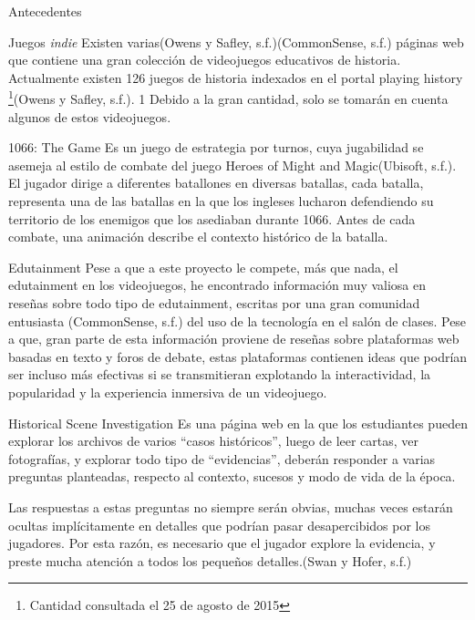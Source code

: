 \begin{section}{Antecedentes}
  \begin{subsection}{Juegos \textit{indie}}
    Existen varias(Owens y Safley, s.f.)(CommonSense, s.f.) páginas web que contiene una gran colección de videojuegos educativos de historia. Actualmente existen 126 juegos de historia indexados en el portal playing history \footnote{Cantidad consultada el 25 de agosto de 2015}(Owens y Safley, s.f.). 1 Debido a la gran cantidad, solo se tomarán en cuenta algunos de estos videojuegos.

    \begin{subsubsection}{1066: The Game}
      Es un juego de estrategia por turnos, cuya jugabilidad se asemeja al estilo de combate del juego Heroes of Might and Magic(Ubisoft, s.f.). El jugador dirige a diferentes batallones en diversas batallas, cada batalla, representa una de las batallas en la que los ingleses lucharon defendiendo su territorio de los enemigos que los asediaban durante 1066. Antes de cada combate, una animación describe
el contexto histórico de la batalla.
    \end{subsubsection}

  \end{subsection}
  \begin{subsection}{Edutainment}
    Pese a que a este proyecto le compete, más que nada, el edutainment en los videojuegos, he encontrado información muy valiosa en reseñas sobre todo tipo de edutainment, escritas por una gran comunidad entusiasta (CommonSense, s.f.) del uso de la tecnología en el salón de clases. Pese a que, gran parte de esta información proviene de reseñas sobre plataformas web basadas en texto y foros de debate, estas plataformas contienen ideas que podrían ser incluso más efectivas si se transmitieran explotando la interactividad, la popularidad y la experiencia inmersiva de un videojuego.

    \begin{subsubsection}{Historical Scene Investigation}
      Es una página web en la que los estudiantes pueden explorar los archivos de varios ``casos históricos'', luego de leer cartas, ver fotografías, y explorar todo tipo de ``evidencias'', deberán responder a varias preguntas planteadas, respecto al contexto, sucesos y modo de vida de la época. 

      Las respuestas a estas preguntas no siempre serán obvias, muchas veces estarán ocultas implícitamente en detalles que podrían pasar desapercibidos por los jugadores. Por esta razón, es necesario que el jugador explore la evidencia, y preste mucha atención a todos los pequeños detalles.(Swan y Hofer, s.f.) 


\end{subsubsection}
\end{subsection}
\end{section}
